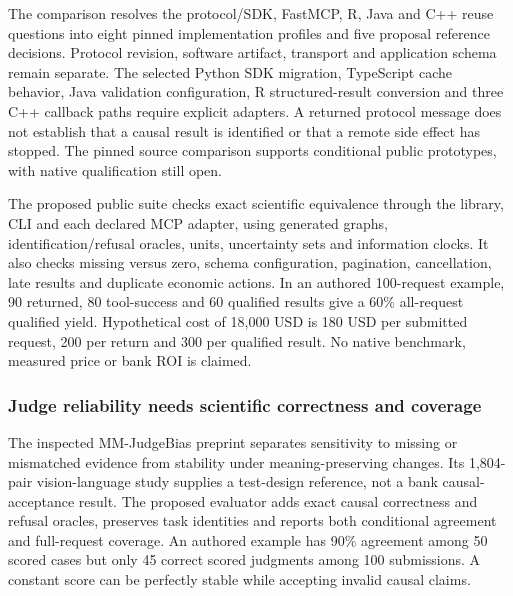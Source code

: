 The comparison resolves the protocol/SDK, FastMCP, R, Java and C++ reuse
questions into eight pinned implementation profiles and five proposal
reference decisions. Protocol revision, software artifact, transport and
application schema remain separate. The selected Python SDK migration,
TypeScript cache behavior, Java validation configuration, R
structured-result conversion and three C++ callback paths require
explicit adapters. A returned protocol message does not establish that a
causal result is identified or that a remote side effect has stopped.
The pinned source comparison supports conditional public prototypes,
with native qualification still open.
\citep{exec24_mcp_python,exec24_mcp_java,exec24_mcp_r}

The proposed public suite checks exact scientific equivalence through
the library, CLI and each declared MCP adapter, using generated graphs,
identification/refusal oracles, units, uncertainty sets and information
clocks. It also checks missing versus zero, schema configuration,
pagination, cancellation, late results and duplicate economic actions.
In an authored 100-request example, 90 returned, 80 tool-success and 60
qualified results give a 60\% all-request qualified yield. Hypothetical
cost of 18,000 USD is 180 USD per submitted request, 200 per return and
300 per qualified result. No native benchmark, measured price or bank
ROI is claimed. \citep{exec24_mcp_contracts}

\hypertarget{judge-reliability-needs-scientific-correctness-and-coverage}{%
\subsubsection{Judge reliability needs scientific correctness and
coverage}\label{judge-reliability-needs-scientific-correctness-and-coverage}}

The inspected MM-JudgeBias preprint separates sensitivity to missing or
mismatched evidence from stability under meaning-preserving changes. Its
1,804-pair vision-language study supplies a test-design reference, not a
bank causal-acceptance result. The proposed evaluator adds exact causal
correctness and refusal oracles, preserves task identities and reports
both conditional agreement and full-request coverage. An authored
example has 90\% agreement among 50 scored cases but only 45 correct
scored judgments among 100 submissions. A constant score can be
perfectly stable while accepting invalid causal claims.
\citep{exec24_judgebias_original,exec24_judgebias_reference}

